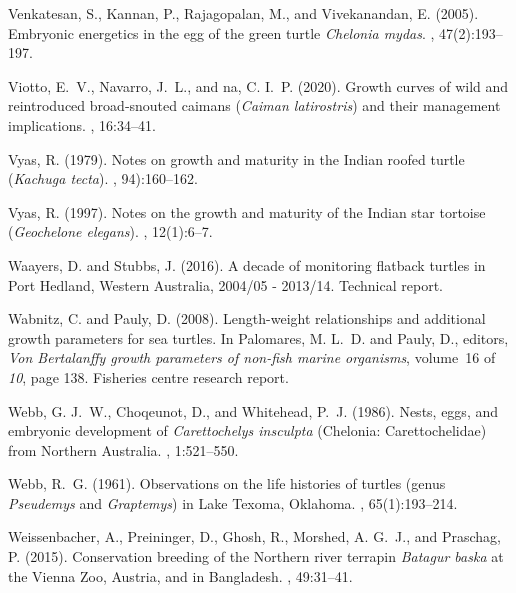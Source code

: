 \documentclass{article}
\begin{document}
\begin{thebibliography}{}
Venkatesan, S., Kannan, P., Rajagopalan, M., and Vivekanandan, E. (2005).
\newblock Embryonic energetics in the egg of the green turtle \emph{Chelonia
  mydas}.
,
  47(2):193--197.

Viotto, E.~V., Navarro, J.~L., and {n}a, C. I.~P. (2020).
\newblock Growth curves of wild and reintroduced broad‑snouted caimans
  (\emph{Caiman latirostris}) and their management implications.
, 16:34–41.

Vyas, R. (1979).
\newblock Notes on growth and maturity in the {I}ndian roofed turtle
  (\emph{Kachuga tecta}).
, 94):160--162.

Vyas, R. (1997).
\newblock Notes on the growth and maturity of the {I}ndian star tortoise
  (\emph{Geochelone elegans}).
, 12(1):6--7.

Waayers, D. and Stubbs, J. (2016).
\newblock A decade of monitoring flatback turtles in {P}ort {H}edland,
  {W}estern {A}ustralia, 2004/05 - 2013/14.
\newblock Technical report.

Wabnitz, C. and Pauly, D. (2008).
\newblock Length-weight relationships and additional growth parameters for sea
  turtles.
\newblock In Palomares, M. L.~D. and Pauly, D., editors, {\em Von Bertalanffy
  growth parameters of non-fish marine organisms}, volume~16 of {\em 10}, page
  138. Fisheries centre research report.

Webb, G. J.~W., Choqeunot, D., and Whitehead, P.~J. (1986).
\newblock Nests, eggs, and embryonic development of \emph{Carettochelys
  insculpta} ({C}helonia: {C}arettochelidae) from {N}orthern {A}ustralia.
, 1:521--550.

Webb, R.~G. (1961).
\newblock Observations on the life histories of turtles (genus \emph{Pseudemys}
  and \emph{Graptemys}) in {L}ake {T}exoma, {O}klahoma.
, 65(1):193--214.

Weissenbacher, A., Preininger, D., Ghosh, R., Morshed, A. G.~J., and Praschag,
  P. (2015).
\newblock Conservation breeding of the {N}orthern river terrapin \emph{Batagur
  baska} at the {V}ienna {Z}oo, {A}ustria, and in {B}angladesh.
, 49:31--41.


\end{thebibliography}
\end{document}
